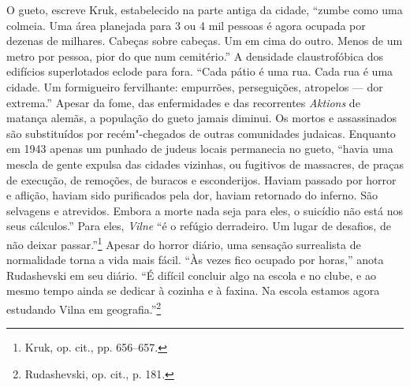 O gueto, escreve Kruk, estabelecido na parte antiga da cidade, ``zumbe
como uma colmeia. Uma área planejada para 3 ou 4 mil pessoas é agora
ocupada por dezenas de milhares. Cabeças sobre cabeças. Um em cima do
outro. Menos de um metro por pessoa, pior do que num cemitério.'' A
densidade claustrofóbica dos edifícios superlotados eclode para fora.
``Cada pátio é uma rua. Cada rua é uma cidade. Um formigueiro
fervilhante: empurrões, perseguições, atropelos --- dor extrema.'' Apesar
da fome, das enfermidades e das recorrentes \textit{Aktions} de matança
alemãs, a população do gueto jamais diminui. Os mortos e assassinados
são substituídos por recém"-chegados de outras comunidades judaicas.
Enquanto em 1943 apenas um punhado de judeus locais permanecia no gueto,
``havia uma mescla de gente expulsa das cidades vizinhas, ou fugitivos
de massacres, de praças de execução, de remoções, de buracos e
esconderijos. Haviam passado por horror e aflição, haviam sido
purificados pela dor, haviam retornado do inferno. São selvagens e
atrevidos. Embora a morte nada seja para eles, o suicídio não está nos
seus cálculos.'' Para eles, \textit{Vilne} ``é o refúgio derradeiro. Um lugar de
desafios, de não deixar passar.''\footnote{Kruk, op. cit., pp. 656--657.}
Apesar do horror diário, uma sensação surrealista de normalidade torna a
vida mais fácil. ``Às vezes fico ocupado por horas,'' anota Rudashevski
em seu diário. ``É difícil concluir algo na escola e no clube, e ao
mesmo tempo ainda se dedicar à cozinha e à faxina. Na escola estamos
agora estudando Vilna em geografia.''\footnote{Rudashevski, op. cit., p. 181.}


